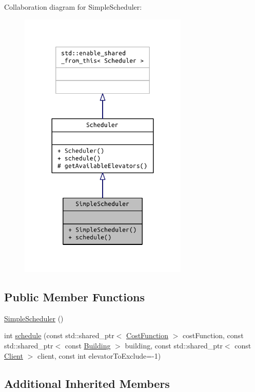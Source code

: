 Collaboration diagram for Simple\+Scheduler\+:
\nopagebreak
\begin{figure}[H]
\begin{center}
\leavevmode
\includegraphics[width=228pt]{class_simple_scheduler__coll__graph}
\end{center}
\end{figure}
\subsection*{Public Member Functions}
\begin{DoxyCompactItemize}
\item 
\hyperlink{class_simple_scheduler_acf9975484a92fc5d37985b92b2b9f05b}{Simple\+Scheduler} ()
\item 
int \hyperlink{class_simple_scheduler_a76990bffc6cf70197e96d41535ebf260}{schedule} (const std\+::shared\+\_\+ptr$<$ \hyperlink{class_cost_function}{Cost\+Function} $>$ cost\+Function, const std\+::shared\+\_\+ptr$<$ const \hyperlink{class_building}{Building} $>$ building, const std\+::shared\+\_\+ptr$<$ const \hyperlink{class_client}{Client} $>$ client, const int elevator\+To\+Exclude=-\/1)
\end{DoxyCompactItemize}
\subsection*{Additional Inherited Members}


